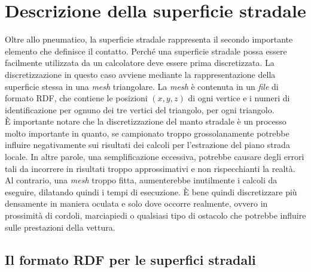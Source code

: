 \chapter{Descrizione della superficie stradale}
\label{rdf}
%
Oltre allo pneumatico, la superficie stradale rappresenta il secondo importante elemento che definisce il contatto. Perché una superficie stradale possa essere facilmente utilizzata da un calcolatore deve essere prima discretizzata. La discretizzazione in questo caso avviene mediante la rappresentazione della superficie stessa in una \textit{mesh} triangolare. La \textit{mesh} è contenuta in un \textit{file} di formato \ac{RDF}, che contiene le posizioni $(x,y,z)$ di ogni vertice e i numeri di identificazione per ognuno dei tre vertici del triangolo, per ogni triangolo.\\
\indent
È importante notare che la discretizzazione del manto stradale è un processo molto importante in quanto, se campionato troppo grossolanamente potrebbe influire negativamente sui risultati dei calcoli per l'estrazione del piano strada locale. In altre parole, una semplificazione eccessiva, potrebbe causare degli errori tali da incorrere in risultati troppo approssimativi e non rispecchianti la realtà. Al contrario, una \textit{mesh} troppo fitta, aumenterebbe inutilmente i calcoli da eseguire, dilatando quindi i tempi di esecuzione. È bene quindi discretizzare più densamente in maniera oculata e solo dove occorre realmente, ovvero in prossimità di cordoli, marciapiedi o qualsiasi tipo di ostacolo che potrebbe influire sulle prestazioni della vettura.

\section{Il formato RDF per le superfici stradali}
%
